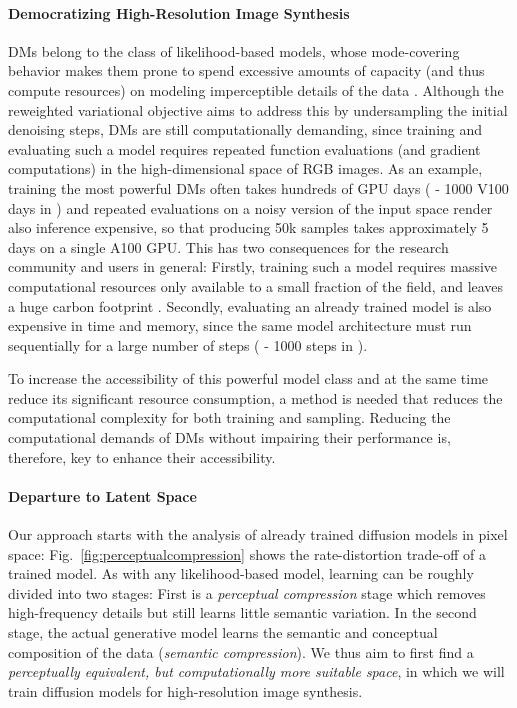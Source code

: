 \documentclass[10pt,twocolumn,letterpaper]{article}
\begin{document}
\paragraph{Democratizing High-Resolution Image Synthesis}
\enlargethispage{\baselineskip}
DMs belong to the class of likelihood-based models, whose mode-covering behavior makes them prone to spend excessive amounts of capacity (and thus compute resources) on modeling imperceptible details of the data \cite{dieleman2020typicality, DBLP:journals/corr/SalimansKCK17}. 
Although the reweighted variational objective \cite{DBLP:conf/nips/HoJA20} 
aims to address this
by undersampling the initial denoising steps, 
DMs are still computationally demanding, since training and evaluating such a model requires repeated function evaluations (and gradient computations) in the high-dimensional space of RGB images.
As an example, training the most powerful DMs often takes hundreds of GPU days ( - 1000 V100 days in \cite{DBLP:journals/corr/abs-2105-05233})
and repeated evaluations on a noisy version of the input space render also inference expensive, so that producing 50k samples takes approximately 5 days \cite{DBLP:journals/corr/abs-2105-05233} on a single A100 GPU. 
This has two consequences for the research community and users in general: 
Firstly, training such a model 
requires massive computational resources only available to a small fraction of the field,
and leaves a huge carbon footprint \cite{DBLP:journals/corr/abs-2104-10350,DBLP:conf/aaai/StrubellGM20}. 
Secondly, evaluating an already trained model is also expensive in time and memory, since the same model architecture must
run sequentially for a large number of steps ( - 1000 steps in \cite{DBLP:journals/corr/abs-2105-05233}).


To increase the accessibility of this powerful model class and at the same time
    reduce its significant resource consumption, a method is needed that
    reduces the computational complexity for both training and sampling.
Reducing the computational demands of DMs without impairing their performance is, therefore, key to enhance their accessibility.



\vspace{-1.5em}
\paragraph{Departure to Latent Space}
Our approach starts with the analysis of already trained diffusion models in pixel space: 
Fig.~\ref{fig:perceptualcompression} shows the rate-distortion trade-off of a trained model. As with any likelihood-based model, learning can be roughly divided into two stages: First is a \emph{perceptual compression} stage which removes high-frequency details 
but still learns little semantic variation. 
In the second stage, the actual generative model learns the semantic and conceptual composition of the data (\emph{semantic compression}).
We thus aim to first find a \textsl{perceptually equivalent, but computationally more suitable space}, in which we will train diffusion models for high-resolution image synthesis. 
\end{document}
